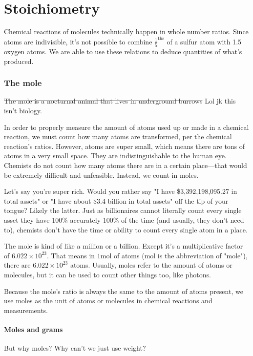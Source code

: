 \documentclass[letterpaper, 12pt]{article}
\begin{document}
\clearpage

\part{Stoichiometry}
Chemical reactions of molecules technically happen in whole number ratios. Since atoms are indivisible, it's not possible to combine $\frac{1}{5}^{\text{ths}}$ of a sulfur atom with 1.5 oxygen atoms. We are able to use these relations to deduce quantities of what's produced.

\section{The mole}
\st{The mole is a nocturnal animal that lives in underground burrows} Lol jk this isn't biology.

In order to properly measure the amount of atoms used up or made in a chemical reaction, we must count how many atoms are transformed, per the chemical reaction's ratios. However, atoms are super small, which means there are tons of atoms in a very small space. They are indistinguishable to the human eye. Chemists do not count how many atoms there are in a certain place---that would be extremely difficult and unfeasible. Instead, we count in moles.

Let's say you're super rich. Would you rather say "I have \$3,392,198,095.27 in total assets" or "I have about \$3.4 billion in total assets" off the tip of your tongue? Likely the latter. Just as billionaires cannot literally count every single asset they have 100\% accurately 100\% of the time (and usually, they don't need to), chemists don't have the time or ability to count every single atom in a place.

The mole is kind of like a million or a billion. Except it's a multiplicative factor of $6.022 \times 10^{23}$. That means in $1 \text{mol}$ of atoms (mol is the abbreviation of "mole"), there are $6.022 \times 10^{23}$ atoms. Usually, moles refer to the amount of atoms or molecules, but it can be used to count other things too, like photons.

Because the mole's ratio is always the same to the amount of atoms present, we use moles as the unit of atoms or molecules in chemical reactions and measurements.

	\subsection{Moles and grams}
	But why moles? Why can't we just use weight?
	
\end{document}
